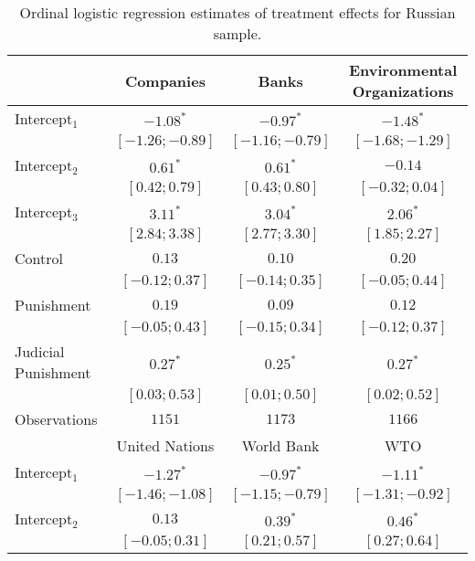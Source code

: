 \begin{table}[h]
\begin{center}
\caption{Ordinal logistic regression estimates of treatment effects for Russian sample.}
\begin{threeparttable}
\begin{tabular}{l c c c}
\hline
 & Companies & Banks & Environmental
Organizations \\
\hline
Intercept$_1$       & $-1.08^{*}$       & $-0.97^{*}$       & $-1.48^{*}$       \\
                    & $ [-1.26; -0.89]$ & $ [-1.16; -0.79]$ & $ [-1.68; -1.29]$ \\
Intercept$_2$       & $0.61^{*}$        & $0.61^{*}$        & $-0.14$           \\
                    & $ [ 0.42;  0.79]$ & $ [ 0.43;  0.80]$ & $ [-0.32;  0.04]$ \\
Intercept$_3$       & $3.11^{*}$        & $3.04^{*}$        & $2.06^{*}$        \\
                    & $ [ 2.84;  3.38]$ & $ [ 2.77;  3.30]$ & $ [ 1.85;  2.27]$ \\
Control             & $0.13$            & $0.10$            & $0.20$            \\
                    & $ [-0.12;  0.37]$ & $ [-0.14;  0.35]$ & $ [-0.05;  0.44]$ \\
Punishment          & $0.19$            & $0.09$            & $0.12$            \\
                    & $ [-0.05;  0.43]$ & $ [-0.15;  0.34]$ & $ [-0.12;  0.37]$ \\
Judicial Punishment & $0.27^{*}$        & $0.25^{*}$        & $0.27^{*}$        \\
                    & $ [ 0.03;  0.53]$ & $ [ 0.01;  0.50]$ & $ [ 0.02;  0.52]$ \\
\hline
Observations        & $1151$            & $1173$            & $1166$            \\
\hline
 & United Nations & World Bank & WTO \\
\hline
Intercept$_1$       & $-1.27^{*}$       & $-0.97^{*}$       & $-1.11^{*}$       \\
                    & $ [-1.46; -1.08]$ & $ [-1.15; -0.79]$ & $ [-1.31; -0.92]$ \\
Intercept$_2$       & $0.13$            & $0.39^{*}$        & $0.46^{*}$        \\
                    & $ [-0.05;  0.31]$ & $ [ 0.21;  0.57]$ & $ [ 0.27;  0.64]$ \\

\end{tabular}
\end{threeparttable}
\end{center}
\end{table}
